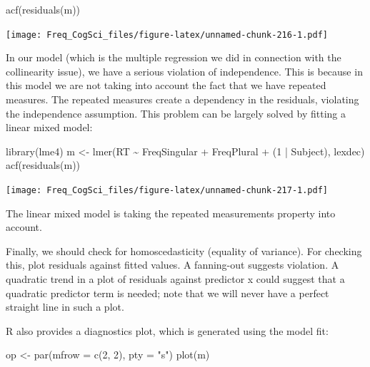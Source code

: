 \documentclass[
  12pt,
]{krantz}
\newenvironment{Shaded}{\begin{snugshade}}{\end{snugshade}}
\newcommand{\AttributeTok}[1]{\textcolor[rgb]{0.77,0.63,0.00}{#1}}
\newcommand{\DecValTok}[1]{\textcolor[rgb]{0.00,0.00,0.81}{#1}}
\newcommand{\FunctionTok}[1]{\textcolor[rgb]{0.00,0.00,0.00}{#1}}
\newcommand{\NormalTok}[1]{#1}
\newcommand{\OtherTok}[1]{\textcolor[rgb]{0.56,0.35,0.01}{#1}}
\newcommand{\SpecialCharTok}[1]{\textcolor[rgb]{0.00,0.00,0.00}{#1}}
\newcommand{\StringTok}[1]{\textcolor[rgb]{0.31,0.60,0.02}{#1}}
\theoremstyle{definition}
\theoremstyle{definition}
\theoremstyle{definition}
\theoremstyle{definition}
\theoremstyle{remark}
\begin{document}
\begin{Shaded}
\begin{Highlighting}[]
\FunctionTok{acf}\NormalTok{(}\FunctionTok{residuals}\NormalTok{(m))}
\end{Highlighting}
\end{Shaded}

\texttt{[image: Freq\_CogSci\_files/figure-latex/unnamed-chunk-216-1.pdf]}

In our model (which is the multiple regression we did in connection with the collinearity issue), we have a serious violation of independence. This is because in this model we are not taking into account the fact that we have repeated measures. The repeated measures create a dependency in the residuals, violating the independence assumption. This problem can be largely solved by fitting a linear mixed model:

\begin{Shaded}
\begin{Highlighting}[]
\FunctionTok{library}\NormalTok{(lme4)}
\NormalTok{m }\OtherTok{\textless{}{-}} \FunctionTok{lmer}\NormalTok{(RT }\SpecialCharTok{\textasciitilde{}}\NormalTok{ FreqSingular }\SpecialCharTok{+}\NormalTok{ FreqPlural }\SpecialCharTok{+}\NormalTok{ (}\DecValTok{1} \SpecialCharTok{|}\NormalTok{ Subject), lexdec)}
\FunctionTok{acf}\NormalTok{(}\FunctionTok{residuals}\NormalTok{(m))}
\end{Highlighting}
\end{Shaded}

\texttt{[image: Freq\_CogSci\_files/figure-latex/unnamed-chunk-217-1.pdf]}

The linear mixed model is taking the repeated measurements property into account.

Finally, we should check for homoscedasticity (equality of variance).
For checking this, plot residuals against fitted values. A fanning-out suggests violation. A quadratic trend in a plot of residuals against predictor x could suggest that a quadratic predictor term is needed; note that we will never have a perfect straight line in such a plot.

R also provides a diagnostics plot, which is generated using the model fit:

\begin{Shaded}
\begin{Highlighting}[]
\NormalTok{op }\OtherTok{\textless{}{-}} \FunctionTok{par}\NormalTok{(}\AttributeTok{mfrow =} \FunctionTok{c}\NormalTok{(}\DecValTok{2}\NormalTok{, }\DecValTok{2}\NormalTok{), }\AttributeTok{pty =} \StringTok{"s"}\NormalTok{)}
\FunctionTok{plot}\NormalTok{(m)}
\end{Highlighting}
\end{Shaded}
\end{document}

